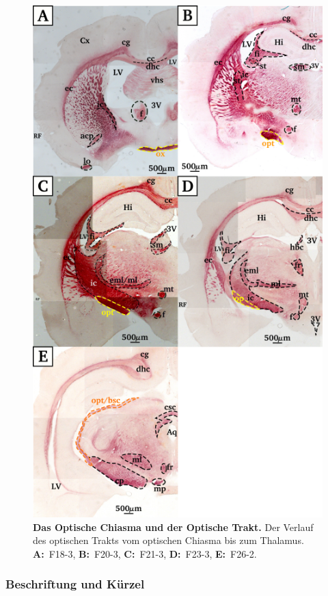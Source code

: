 \begin{figure}[H]
    \centering
    \includegraphics{pictures/visual/optic_tract.png}
    \caption[Das Optische Chiasma und der Optische Trakt]{\textbf{Das Optische Chiasma und der Optische Trakt.} Der Verlauf des optischen Trakts vom optischen Chiasma bis zum Thalamus. \textbf{A:}~F18-3, \textbf{B:}~F20-3, \textbf{C:}~F21-3, \textbf{D:}~F23-3, \textbf{E:}~F26-2.}
    \label{fig:optic_tract}
\end{figure}

\subsubsection*{Beschriftung und Kürzel}

